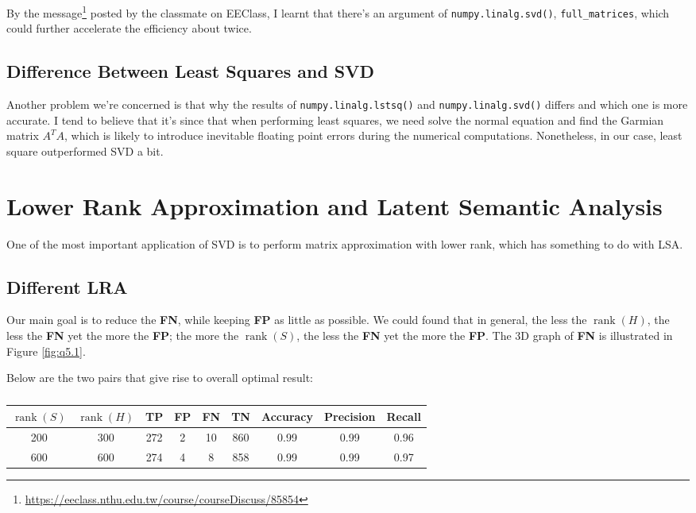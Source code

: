 \documentclass[12pt, a4paper]{article}
\begin{document}
By the message\footnote{\url{https://eeclass.nthu.edu.tw/course/courseDiscuss/85854}} posted by the classmate on EEClass, I learnt that there's an argument of \texttt{numpy.linalg.svd()}, \texttt{full\_matrices}, which could further accelerate the efficiency about twice.

\subsection{Difference Between Least Squares and SVD}

Another problem we're concerned is that why the results of \texttt{numpy.linalg.lstsq()} and \texttt{numpy.linalg.svd()} differs and which one is more accurate. I tend to believe that it's since that when performing least squares, we need solve the normal equation and find the Garmian matrix $A^TA$, which is likely to introduce inevitable floating point errors during the numerical computations. Nonetheless, in our case, least square outperformed SVD a bit.

\section{Lower Rank Approximation and Latent Semantic Analysis}

One of the most important application of SVD is to perform matrix approximation with lower rank, which has something to do with LSA.

\subsection{Different LRA}

Our main goal is to reduce the \textbf{FN}, while keeping \textbf{FP} as little as possible. We could found that in general, the less the $\operatorname{rank}(H)$, the less the \textbf{FN} yet the more the \textbf{FP}; the more the $\operatorname{rank}(S)$, the less the \textbf{FN} yet the more the \textbf{FP}. The 3D graph of \textbf{FN} is illustrated in Figure \ref{fig:q5.1}.

Below are the two pairs that give rise to overall optimal result:

\begin{table}[htp]
\centering
\caption{}
\begin{tabular}{cc|cccc|ccc}
\toprule
$\operatorname{rank}(S)$ & $\operatorname{rank}(H)$ & TP & FP & FN & TN & Accuracy & Precision & Recall \\
\midrule
200 & 300 & 272 & 2 & 10 & 860 & 0.99 & 0.99 & 0.96 \\
600 & 600 & 274 & 4 & 8 & 858 & 0.99 & 0.99 & 0.97 \\
\bottomrule
\end{tabular}
\label{tab:q5.1}
\end{table}
\end{document}
